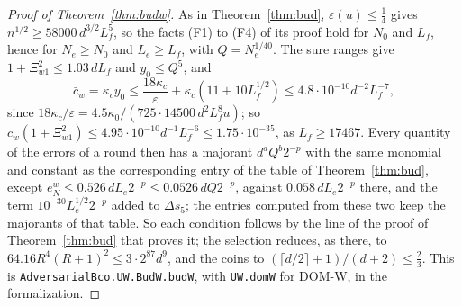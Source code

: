 \documentclass[11pt]{amsart}
\theoremstyle{definition}
\numberwithin{equation}{section}
\begin{document}
\begin{proof}[Proof of Theorem~\ref{thm:budw}]
As in Theorem~\ref{thm:bud}, $\varepsilon(u)\le\frac14$ gives $n^{1/2}\ge58000\,d^{3/2}L_f^5$, so the facts (F1) to (F4) of its proof hold for $N_0$ and $L_f$, hence for $N_e\ge N_0$ and $L_e\ge L_f$, with $Q=N_e^{1/40}$. The sure ranges give $1+\Xi_{w1}^2\le1.03\,dL_f$ and $y_0\le Q^5$, and
\[
\bar c_w=\kappa_cy_0\le\frac{18\kappa_c}\varepsilon+\kappa_c(11+10L_f^{1/2})\le4.8\cdot10^{-10}d^{-2}L_f^{-7},
\]
since $18\kappa_c/\varepsilon=4.5\kappa_0/(725\cdot14500\,d^2L_f^8u)$; so $\bar c_w(1+\Xi_{w1}^2)\le4.95\cdot10^{-10}d^{-1}L_f^{-6}\le1.75\cdot10^{-35}$, as $L_f\ge17467$. Every quantity of the errors of a round then has a majorant $d^aQ^b2^{-p}$ with the same monomial and constant as the corresponding entry of the table of Theorem~\ref{thm:bud}, except $e^w_N\le0.526\,dL_e2^{-p}\le0.0526\,dQ2^{-p}$, against $0.058\,dL_e2^{-p}$ there, and the term $10^{-30}L_e^{1/2}2^{-p}$ added to $\Delta s_5$; the entries computed from these two keep the majorants of that table. So each condition follows by the line of the proof of Theorem~\ref{thm:bud} that proves it; the selection reduces, as there, to $64.16R^4(R+1)^2\le3\cdot2^{87}d^9$, and the coins to $(\lceil d/2\rceil+1)/(d+2)\le\frac23$. This is \texttt{AdversarialBco.\allowbreak UW.\allowbreak BudW.\allowbreak budW}, with \texttt{UW.\allowbreak domW} for DOM-W, in the formalization.
\end{proof}
\end{document}
